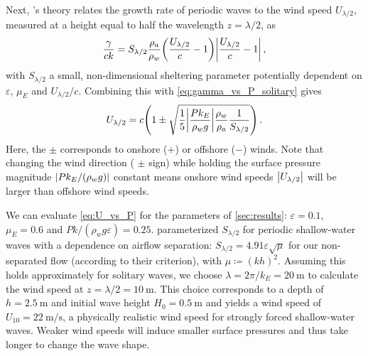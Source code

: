 \documentclass{jfm}
\renewcommand*{\epsilon}{\varepsilon}
\begin{document}
Next, \citeauthor{jeffreys1925formation}'s
\citeyearpar{jeffreys1925formation} theory relates the growth rate of
periodic waves to the wind speed $U_{\lambda/2}$,
measured at a height equal to half the wavelength $z=\lambda/2$, as
\begin{equation}
  \frac{\gamma}{c k} = S_{\lambda/2} \frac{\rho_a}{\rho_w}
    \pqty{\frac{U_{\lambda/2}}{c}-1}
    \abs{\frac{U_{\lambda/2}}{c}-1} \,,
  \label{eq:gamma_vs_u_jeffreys}
\end{equation}
with $S_{\lambda/2}$ a small, non-dimensional sheltering parameter
potentially dependent on $\epsilon$, $\mu_E$ and $U_{\lambda/2}/c$.
Combining this with \cref{eq:gamma_vs_P_solitary} gives
\begin{equation}
  U_{\lambda/2} = c \pqty{1 \pm \sqrt{\frac{1}{5} \abs{\frac{P k_E}{\rho_w g}}
    \frac{\rho_w}{\rho_a} \frac{1}{S_{\lambda/2}}}} \,.
  \label{eq:U_vs_P}
\end{equation}
Here, the $\pm$ corresponds to onshore ($+$) or offshore ($-$) winds.
Note that changing the wind direction (\ie{} $\pm$ sign) while holding
the surface pressure magnitude $\abs{Pk_E/(\rho_w g)}$ constant means
onshore wind speeds $\abs{U_{\lambda/2}}$ will be larger than offshore
wind speeds.

We can evaluate \cref{eq:U_vs_P} for the parameters of
\cref{sec:results}: $\epsilon=0.1$, $\mu_E = 0.6$ and $Pk/(\rho_w g
\epsilon) = 0.25$.
 parameterized $S_{\lambda/2}$ for
periodic shallow-water waves with a dependence on airflow separation:
$S_{\lambda/2} = 4.91 \epsilon \sqrt{\mu}$ for our non-separated
flow (according to their criterion), with $\mu \coloneqq (kh)^2$.
Assuming this holds approximately for solitary waves, we choose $\lambda
= 2 \pi/k_E = \SI{20}{\meter}$ to calculate the wind speed at $z
= \lambda/2 = \SI{10}{\meter}$.
This choice corresponds to a depth of $h = \SI{2.5}{\meter}$ and initial
wave height $H_0 = \SI{0.5}{\meter}$ and yields a wind speed of $U_{10}
= \SI{22}{\meter\per\second}$, a physically realistic wind speed for
strongly forced shallow-water waves.
Weaker wind speeds will induce smaller surface pressures and thus take
longer to change the wave shape.
\end{document}
